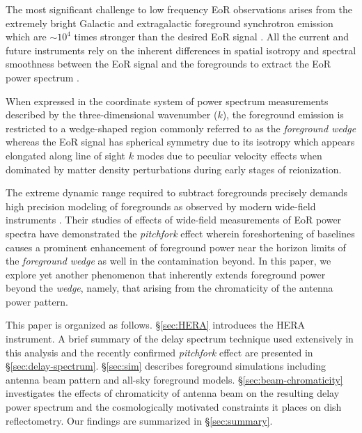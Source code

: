 \documentclass[preprint2,iop,numberedappendix,twocolappendix,appendixfloats]{emulateapj}
\begin{document}
The most significant challenge to low frequency EoR observations arises from the extremely bright Galactic and extragalactic foreground synchrotron emission which are $\sim 10^4$ times stronger than the desired EoR signal \citep{dim02,ali08,ber09,ber10,gho12}. All the current and future instruments rely on the inherent differences in spatial isotropy and spectral smoothness between the EoR signal and the foregrounds to extract the EoR power spectrum \citep[see, e.g.,][]{fur04,mor04,zal04,san05,fur06,mcq06,mor06,wan06,gle08}. 

When expressed in the coordinate system of power spectrum measurements described by the three-dimensional wavenumber ($k$), the foreground emission is restricted to a wedge-shaped region commonly referred to as the {\it foreground wedge} \citep{bow09,liu09,liu14a,liu14b,dat10,liu11,gho12,mor12,par12b,tro12,ved12,dil13,pob13,thy13,dil14} whereas the EoR signal has spherical symmetry due to its isotropy which appears elongated along line of sight $k$ modes due to peculiar velocity effects when dominated by matter density perturbations during early stages of reionization. 

The extreme dynamic range required to subtract foregrounds precisely demands high precision modeling of foregrounds as observed by modern wide-field instruments \citep{thy15a,thy15b}. Their studies of effects of wide-field measurements of EoR power spectra have demonstrated the {\it pitchfork} effect wherein foreshortening of baselines causes a prominent enhancement of foreground power near the horizon limits of the {\it foreground wedge} as well in the contamination beyond. In this paper, we explore yet another phenomenon that inherently extends foreground power beyond the {\it wedge}, namely, that arising from the chromaticity of the antenna power pattern. %

This paper is organized as follows. \S\ref{sec:HERA} introduces the HERA instrument. A brief summary of the delay spectrum technique used extensively in this analysis and the recently confirmed {\it pitchfork} effect are presented in \S\ref{sec:delay-spectrum}. \S\ref{sec:sim} describes foreground simulations including antenna beam pattern and all-sky foreground models. \S\ref{sec:beam-chromaticity} investigates the effects of chromaticity of antenna beam on the resulting delay power spectrum and the cosmologically motivated constraints it places on dish reflectometry. Our findings are summarized in \S\ref{sec:summary}.
\end{document}
